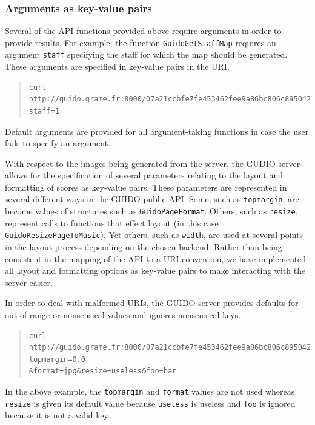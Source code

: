 \documentclass{article}
\begin{document}
\subsubsection{Arguments as key-value pairs}
Several of the API functions provided above require arguments in order to provide results.  For example, the function \verb=GuidoGetStaffMap= requires an argument \verb=staff= specifying the staff for which the map should be generated.  These arguments are specified in key-value pairs in the URI.
\begin{quote}
\begingroup
\fontsize{7.5pt}{12pt}\selectfont
\begin{verbatim}
curl http://guido.grame.fr:8000/07a21ccbfe7fe453462fee9a86bc806c8950423f/staffmap?staff=1
\end{verbatim}
\endgroup
\end{quote}
Default arguments are provided for all argument-taking functions in case the user fails to specify an argument.\par
With respect to the images being generated from the server, the GUDIO server allows for the specification of several parameters relating to the layout and formatting of scores as key-value pairs.  These parameters are represented in several different ways in the GUIDO public API.  Some, such as \verb=topmargin=, are become values of structures such as \verb=GuidoPageFormat=.  Others, such as \verb=resize=, represent calls to functions that effect layout (in this case \verb=GuidoResizePageToMusic=).  Yet others, such as \verb=width=, are used at several points in the layout process depending on the chosen backend.  Rather than being consistent in the mapping of the API to a URI convention, we have implemented all layout and formatting options as key-value pairs to make interacting with the server easier.\par
In order to deal with malformed URIs, the GUIDO server provides defaults for out-of-range or nonsensical values and ignores nonsensical keys.
\begin{quote}
\begingroup
\fontsize{7.5pt}{12pt}\selectfont
\begin{verbatim}
curl http://guido.grame.fr:8000/07a21ccbfe7fe453462fee9a86bc806c8950423f/?topmargin=0.0
&format=jpg&resize=useless&foo=bar
\end{verbatim}
\endgroup
\end{quote}
In the above example, the \verb=topmargin= and \verb=format= values are not used whereas \verb=resize= is given its default value because \verb=useless= is  useless and \verb=foo= is ignored because it is not a valid key. \par
\end{document}
